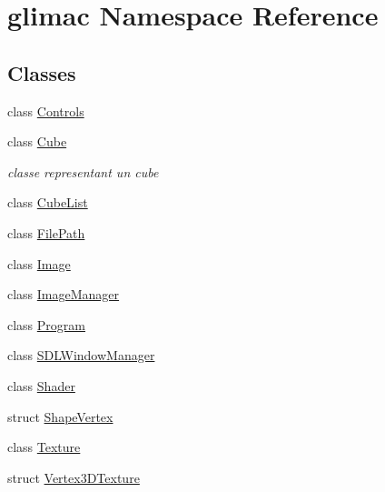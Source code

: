 \hypertarget{namespaceglimac}{}\section{glimac Namespace Reference}
\label{namespaceglimac}
\subsection*{Classes}
\begin{DoxyCompactItemize}
\item 
class \hyperlink{classglimac_1_1Controls}{Controls}
\item 
class \hyperlink{classglimac_1_1Cube}{Cube}
\begin{DoxyCompactList}\small\item\em classe representant un cube \end{DoxyCompactList}\item 
class \hyperlink{classglimac_1_1CubeList}{Cube\+List}
\item 
class \hyperlink{classglimac_1_1FilePath}{File\+Path}
\item 
class \hyperlink{classglimac_1_1Image}{Image}
\item 
class \hyperlink{classglimac_1_1ImageManager}{Image\+Manager}
\item 
class \hyperlink{classglimac_1_1Program}{Program}
\item 
class \hyperlink{classglimac_1_1SDLWindowManager}{S\+D\+L\+Window\+Manager}
\item 
class \hyperlink{classglimac_1_1Shader}{Shader}
\item 
struct \hyperlink{structglimac_1_1ShapeVertex}{Shape\+Vertex}
\item 
class \hyperlink{classglimac_1_1Texture}{Texture}
\item 
struct \hyperlink{structglimac_1_1Vertex3DTexture}{Vertex3\+D\+Texture}
\end{DoxyCompactItemize}
